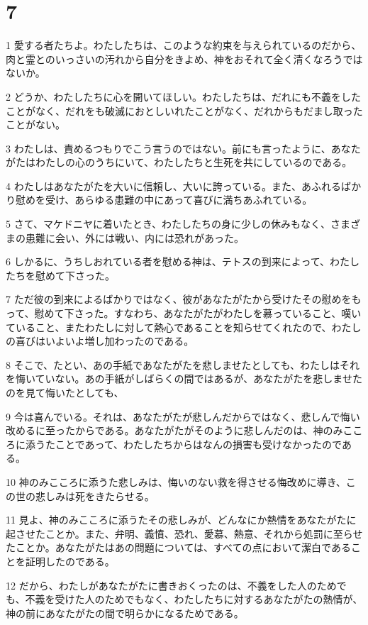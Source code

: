 \chapter{7}

\par 1 愛する者たちよ。わたしたちは、このような約束を与えられているのだから、肉と霊とのいっさいの汚れから自分をきよめ、神をおそれて全く清くなろうではないか。
\par 2 どうか、わたしたちに心を開いてほしい。わたしたちは、だれにも不義をしたことがなく、だれをも破滅におとしいれたことがなく、だれからもだまし取ったことがない。
\par 3 わたしは、責めるつもりでこう言うのではない。前にも言ったように、あなたがたはわたしの心のうちにいて、わたしたちと生死を共にしているのである。
\par 4 わたしはあなたがたを大いに信頼し、大いに誇っている。また、あふれるばかり慰めを受け、あらゆる患難の中にあって喜びに満ちあふれている。
\par 5 さて、マケドニヤに着いたとき、わたしたちの身に少しの休みもなく、さまざまの患難に会い、外には戦い、内には恐れがあった。
\par 6 しかるに、うちしおれている者を慰める神は、テトスの到来によって、わたしたちを慰めて下さった。
\par 7 ただ彼の到来によるばかりではなく、彼があなたがたから受けたその慰めをもって、慰めて下さった。すなわち、あなたがたがわたしを慕っていること、嘆いていること、またわたしに対して熱心であることを知らせてくれたので、わたしの喜びはいよいよ増し加わったのである。
\par 8 そこで、たとい、あの手紙であなたがたを悲しませたとしても、わたしはそれを悔いていない。あの手紙がしばらくの間ではあるが、あなたがたを悲しませたのを見て悔いたとしても、
\par 9 今は喜んでいる。それは、あなたがたが悲しんだからではなく、悲しんで悔い改めるに至ったからである。あなたがたがそのように悲しんだのは、神のみこころに添うたことであって、わたしたちからはなんの損害も受けなかったのである。
\par 10 神のみこころに添うた悲しみは、悔いのない救を得させる悔改めに導き、この世の悲しみは死をきたらせる。
\par 11 見よ、神のみこころに添うたその悲しみが、どんなにか熱情をあなたがたに起させたことか。また、弁明、義憤、恐れ、愛慕、熱意、それから処罰に至らせたことか。あなたがたはあの問題については、すべての点において潔白であることを証明したのである。
\par 12 だから、わたしがあなたがたに書きおくったのは、不義をした人のためでも、不義を受けた人のためでもなく、わたしたちに対するあなたがたの熱情が、神の前にあなたがたの間で明らかになるためである。

